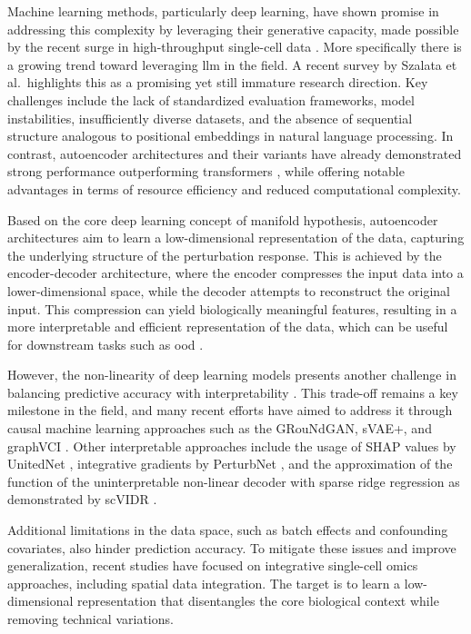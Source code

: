 \documentclass[12pt, a4paper]{article}
\begin{document}
Machine learning methods, particularly deep learning, have shown promise in addressing this complexity by leveraging their generative capacity, made possible by the recent surge in high-throughput single-cell data \cite{gavriilidisMinireviewPerturbationModelling2024}.
More specifically there is a growing trend toward leveraging \gls{llm} in the field. A recent survey by Szalata et al. \cite{szalata2024transformers} highlights this as a promising yet still immature research direction. Key challenges include the lack of standardized evaluation frameworks, model instabilities, insufficiently diverse datasets, and the absence of sequential structure analogous to positional embeddings in natural language processing.
In contrast, autoencoder architectures and their variants have already demonstrated strong performance outperforming transformers \cite{szalata2024transformers}, while offering notable advantages in terms of resource efficiency and reduced computational complexity.


Based on the core deep learning concept of manifold hypothesis, autoencoder architectures aim to learn a low-dimensional representation of the data, capturing the underlying structure of the perturbation response. This is achieved by the encoder-decoder architecture, where the encoder compresses the input data into a lower-dimensional space, while the decoder attempts to reconstruct the original input. This compression can yield biologically meaningful features, resulting in a more interpretable and efficient representation of the data, which can be useful for downstream tasks such as \gls{ood} \cite{gavriilidisMinireviewPerturbationModelling2024}.


However, the non-linearity of deep learning models presents another challenge in balancing predictive accuracy with interpretability \cite{kana2023generative}. This trade-off remains a key milestone in the field, and many recent efforts have aimed to address it through causal machine learning approaches such as the GRouNdGAN, sVAE+, and graphVCI \cite{gavriilidisMinireviewPerturbationModelling2024}. Other interpretable approaches include the usage of SHAP values by UnitedNet \cite{tangExplainableMultitaskLearning2023}, integrative gradients by PerturbNet \cite{yuPerturbNetPredictsSinglecell2022},  and the approximation of the function of the uninterpretable non-linear decoder with sparse ridge regression as demonstrated by scVIDR \cite{kanaGenerativeModelingSinglecell2023}.

Additional limitations in the data space, such as batch effects and confounding covariates, also hinder prediction accuracy. To mitigate these issues and improve generalization, recent studies have focused on integrative single-cell omics approaches, including spatial data integration. The target is to learn a low-dimensional representation that disentangles the core biological context while removing technical variations.
\end{document}

